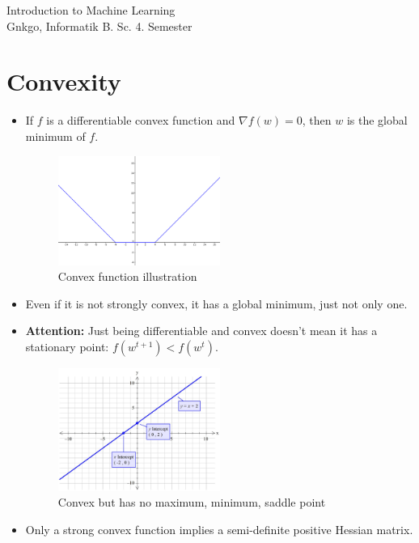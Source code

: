 \documentclass{article}
\begin{document}
\begin{titlepage}
    \thispagestyle{fancy}
    \renewcommand{\headrulewidth}{1pt}

    \center
    \vspace*{1.0cm}
    \Large Introduction to Machine Learning \\[.5 cm]
    \large
    \normalsize
    Gnkgo, Informatik B. Sc. 4. Semester \\
    \vfill
\end{titlepage}

\tableofcontents
\newpage %

\section{Convexity}
\begin{itemize}
    \item If $f$ is a differentiable convex function and $\nabla f(w) = 0$, then $w$ is the global minimum of $f$.
    \begin{figure}[h]
        \centering
        \includegraphics[width=0.5\textwidth]{assets/convex.png}
        \caption{Convex function illustration}
    \end{figure}
    \item Even if it is not strongly convex, it has a global minimum, just not only one.
    \item \textbf{Attention:} Just being differentiable and convex doesn't mean it has a stationary point: $f(w^{t+1}) < f(w^t)$.
    \begin{figure}[h]
        \centering
        \includegraphics[width=0.5\textwidth]{assets/x.jpeg}
        \caption{Convex but has no maximum, minimum, saddle point}
    \end{figure}
    \item Only a strong convex function implies a semi-definite positive Hessian matrix.
\end{itemize}
\end{document}
